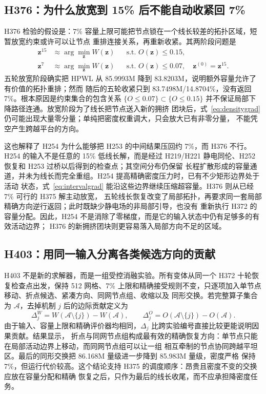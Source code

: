 \documentclass[UTF8,a4paper,11pt]{ctexrep}
\begin{document}
\subsection{H376：为什么放宽到 15\% 后不能自动收紧回 7\%}
H376 检验的假设是：7\% 容量上限可能把节点锁在一个线长较差的拓扑区域，短暂放宽约束或许可以让节点
重排连接关系，再重新收紧。其两阶段问题是
\begin{align}
\bm z^{15}&\approx\arg\min_{\bm z} W(\bm z)
&&\text{s.t. }O(\bm z)\leq 0.15,\label{eq:h376relax}\\
\bm z^{7}&\approx\arg\min_{\bm z} W(\bm z)
&&\text{s.t. }O(\bm z)\leq 0.07,
\quad \bm z^{(0)}=\bm z^{15}.\label{eq:h376tighten}
\end{align}
五轮放宽阶段确实把 HPWL 从 85.9993M 降到 83.8203M，说明额外容量允许了有价值的拓扑重排；然而
随后的五轮收紧只到 83.7498M/14.8704\%，没有返回 7\%。根本原因是约束集合的包含关系
$\{O\leq0.07\}\subset\{O\leq0.15\}$ 并不保证局部下降路径连通。放宽阶段为了线长把节点送入新的拥挤
团块后，式~\eqref{eq:densitygrad} 仍可能出现大量零分量；单纯把密度权重调大，只会放大已有非零分量，
不能凭空产生跨越平台的方向。

这也解释了 H254 为什么能够把 H253 的中间结果压回约 7\%，而 H376 不行。H254 的输入不是任意的 15\%
低线长解，而是经过 H219/H221 静电同伦、H252 恢复和 H253 过桥以后得到的检查点；其空间分布仍保留
长程扩散形成的容量通道，并未为线长而完全重组。H254 提高精确密度压力时，已有不少矩形边界处于活动
状态，式~\eqref{eq:intervalgrad} 能沿这些边界继续压缩超容量。H376 则从已经 7\% 可行的 H375 解主动放宽，
五轮线长恢复改变了局部拓扑，再要求同一套局部精确方向逆行返回；此时既缺少静电场的非局部引导，也没有
重新执行 H372 的容量分配。因此，H254 不是消除了零梯度，而是它的输入状态中仍有足够多的有效活动边界；
H376 的新拥挤团块则更容易落入局部方向不足的区域。

\subsection{H403：用同一输入分离各类候选方向的贡献}
H403 不是新的求解器，而是一组受控消融实验。所有变体从同一个 H372 十轮恢复检查点出发，保持 512
网格、7\% 上限和精确接受规则不变，只逐项加入单节点移动、折点候选、紧凑方向、同网节点组、收缩以及
同形交换。若完整算子集合为 $\mathcal A$，去掉机制 $j$ 后的边际贡献定义为
\begin{equation}
\Delta_j^W=W(\mathcal A\setminus\{j\})-W(\mathcal A),\qquad
\Delta_j^O=O(\mathcal A\setminus\{j\})-O(\mathcal A).
\label{eq:ablation}
\end{equation}
由于输入、容量上限和精确评价器均相同，$\Delta_j$ 比跨实验编号直接比较更能说明因果贡献。结果显示，
折点与同网节点组构成最有效的精确恢复方向：单节点只能在局部活动边界上移动，而同网节点组可以让一组
相互牵制的节点协同跨越平坦区。最后的同形交换把 86.168M 量级进一步降到 85.983M 量级，密度严格
保持 7\%，但运行代价较高。这个结论支持 H375 的调度顺序：昂贵且密度不变的交换应放在容量分配和精确
恢复之后，只作为最后的线长收尾，而不应承担降密度任务。
\end{document}
